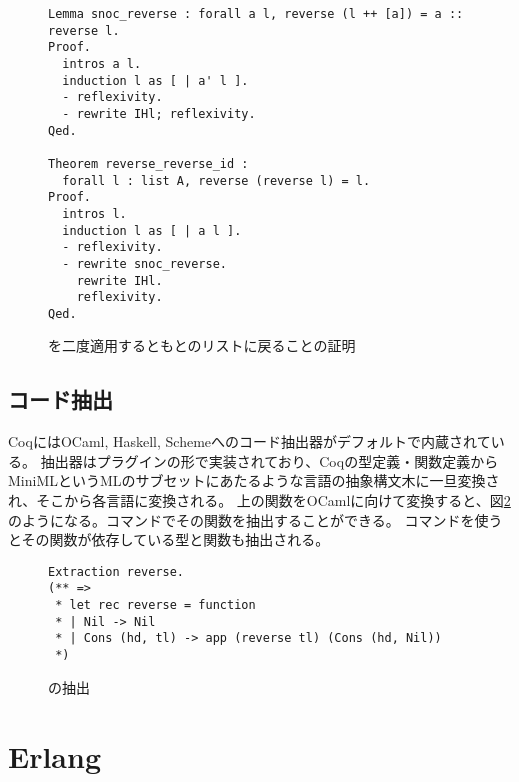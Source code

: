 \begin{figure}
\begin{lstlisting}
Lemma snoc_reverse : forall a l, reverse (l ++ [a]) = a :: reverse l.
Proof.
  intros a l.
  induction l as [ | a' l ].
  - reflexivity.
  - rewrite IHl; reflexivity.
Qed.

Theorem reverse_reverse_id :
  forall l : list A, reverse (reverse l) = l.
Proof.
  intros l.
  induction l as [ | a l ].
  - reflexivity.
  - rewrite snoc_reverse.
    rewrite IHl.
    reflexivity.
Qed.
\end{lstlisting}
\label{code:background:reverse-reverse}
\caption{を二度適用するともとのリストに戻ることの証明}
\end{figure}


\subsection{コード抽出}

CoqにはOCaml, Haskell, Schemeへのコード抽出器がデフォルトで内蔵されている。
抽出器はプラグインの形で実装されており、Coqの型定義・関数定義からMiniMLというMLのサブセットにあたるような言語の抽象構文木に一旦変換され、そこから各言語に変換される。
上の関数をOCamlに向けて変換すると、図\ref{code:background:reverse-erl}のようになる。コマンドでその関数を抽出することができる。
コマンドを使うとその関数が依存している型と関数も抽出される。

\begin{figure}
\begin{lstlisting}
Extraction reverse.
(** =>
 * let rec reverse = function
 * | Nil -> Nil
 * | Cons (hd, tl) -> app (reverse tl) (Cons (hd, Nil))
 *)
\end{lstlisting}
\label{code:background:reverse-erl}
\caption{の抽出}
\end{figure}



\section{Erlang}

